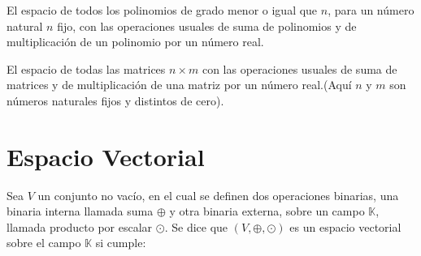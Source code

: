 \begin{ejemplo}
El espacio de todos los polinomios de grado menor o igual que $n$, para un número natural $n$ fijo, con las operaciones usuales de suma de polinomios y de multiplicación de un polinomio por un número real.
\end{ejemplo}

\begin{ejemplo}
El espacio de todas las matrices $n \times m$ con las operaciones usuales de suma de matrices y de multiplicación de una matriz por un número real.(Aquí $n$ y $m$ son números naturales fijos y distintos de cero).


\end{ejemplo}





\section{Espacio Vectorial}
\begin{dfn}
Sea $V$ un conjunto no vac\'io, en el cual se definen dos operaciones binarias, una binaria interna llamada suma $\oplus$ y otra binaria externa, sobre un campo $\mathbb{K}$, llamada producto por escalar $\odot$. Se dice que $\left( V,\oplus ,\odot \right) $ es un espacio vectorial sobre el campo $\mathbb{K}$ si cumple:
\end{dfn}


